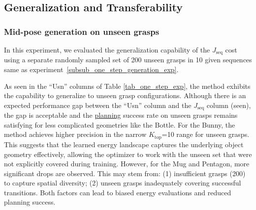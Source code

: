 \documentclass[journal, twoside]{IEEEtran}
\newif\ifshownotes
\newcommand{\lqin}[1]{\ifshownotes{\color{darkgreen}\begin{CJK*}{UTF8}{gkai}\small#1\end{CJK*}}\fi}
\newcommand{\lqinextra}[1]{\ifshownotes{\color{babyblue}\begin{CJK*}{UTF8}{gkai}\small#1\end{CJK*}}\fi}
\begin{document}
\subsection{Generalization and Transferability}

\subsubsection{Mid-pose generation on unseen grasps}
In this experiment, we evaluated the generalization capability of the $J_\mathrm{seq}$ cost using a separate randomly sampled set of 200 unseen grasps in 10 given sequences same as experiment~\ref{subsub_one_step_generation_exp}.

As seen in the ``Usn'' columns of Table \ref{tab_one_step_exp}, the method exhibits the capability to generalize to unseen grasp configurations. Although there is an expected performance gap between the ``Usn'' column and the $J_\mathrm{seq}$ column (seen), the gap is acceptable and the \uline{planning}\lqin{verification} success rate \lqin{(S.V.) measured after the shared-grasp threshold-$h$ filtering, followed by additional IK and collision checking.} \lqinextra{前文提到过S.V.的定义了，这里是否就不需要再提了？}on unseen grasps remains satisfying for less complicated geometries like the Bottle. For the Bunny, the method achieves higher precision in the narrow $K_{\mathrm{top}}$=10 range for unseen grasps. This suggests that the learned energy landscape captures the underlying object geometry effectively, allowing the optimizer to work with the unseen set that were not explicitly covered during training. However, for the Mug and Pentagon, more significant drops are observed. This may stem from: (1) insufficient grasps (200) to capture spatial diversity; (2) unseen grasps inadequately covering successful transitions. Both factors can lead to biased energy evaluations and reduced planning success.
\end{document}
